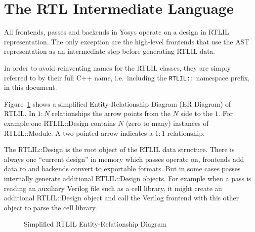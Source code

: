 \section{The RTL Intermediate Language}

All frontends, passes and backends in Yosys operate on a design in RTLIL representation.
The only exception are the high-level frontends that use the AST representation as an intermediate step before generating RTLIL
data.

In order to avoid reinventing names for the RTLIL classes, they are simply referred to by their full C++ name, i.e.~including
the {\tt RTLIL::} namespace prefix, in this document.

Figure~\ref{fig:Overview_RTLIL} shows a simplified Entity-Relationship Diagram (ER Diagram) of RTLIL. In $1:N$ relationships the arrow
points from the $N$ side to the $1$. For example one RTLIL::Design contains $N$ (zero to many) instances of RTLIL::Module.
A two-pointed arrow indicates a $1:1$ relationship.

The RTLIL::Design is the root object of the RTLIL data structure. There is always one ``current design'' in memory
which passes operate on, frontends add data to and backends convert to exportable formats. But in some cases passes
internally generate additional RTLIL::Design objects. For example when a pass is reading an auxiliary Verilog file such
as a cell library, it might create an additional RTLIL::Design object and call the Verilog frontend with this
other object to parse the cell library.

\begin{figure}[t]
	\hfil
	\caption{Simplified RTLIL Entity-Relationship Diagram}
	\label{fig:Overview_RTLIL}
\end{figure}

